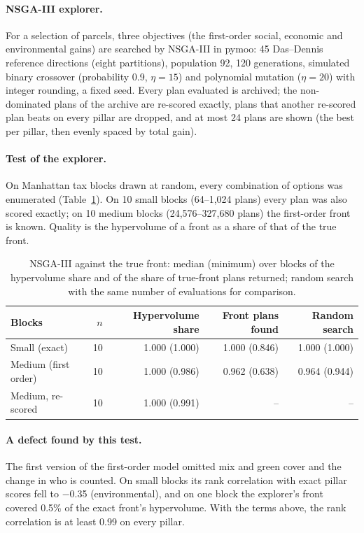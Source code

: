\documentclass[10pt]{article}
\begin{document}
\paragraph{NSGA-III explorer.} For a selection of parcels, three objectives (the first-order social, economic and
environmental gains) are searched by NSGA-III \citep{deb2014} in pymoo: 45 Das--Dennis reference
directions (eight partitions), population 92, 120 generations, simulated binary crossover
(probability 0.9, $\eta = 15$) and polynomial mutation ($\eta = 20$) with integer rounding, a fixed seed. Every plan
evaluated is archived; the non-dominated plans of the archive are re-scored exactly, plans that another re-scored
plan beats on every pillar are dropped, and at most 24 plans are shown (the best per pillar, then evenly
spaced by total gain).

\paragraph{Test of the explorer.} On Manhattan tax blocks drawn at random, every combination of options was enumerated
(Table~\ref{tab:s-nsga}). On 10 small blocks (64--1{,}024 plans) every plan was also scored exactly;
on 10 medium blocks (24{,}576--327{,}680 plans) the first-order front is known. Quality is the hypervolume of a
front as a share of that of the true front.

\begin{table}[t]
\centering
\footnotesize
\setlength{\tabcolsep}{4pt}
\caption{NSGA-III against the true front: median (minimum) over blocks of the hypervolume share and of the share of true-front plans returned; random search with the same number of evaluations for comparison.}
\label{tab:s-nsga}
\begin{tabular}{lrrrr}
\toprule
Blocks & $n$ & Hypervolume share & Front plans found & Random search \\
\midrule
Small (exact) & 10 & 1.000 (1.000) & 1.000 (0.846) & 1.000 (1.000) \\
Medium (first order) & 10 & 1.000 (0.986) & 0.962 (0.638) & 0.964 (0.944) \\
Medium, re-scored & 10 & 1.000 (0.991) & -- & -- \\
\bottomrule
\end{tabular}
\end{table}

\paragraph{A defect found by this test.} The first version of the first-order model omitted mix and green cover and
the change in who is counted. On small blocks its rank correlation with exact pillar scores fell to
$-$0.35 (environmental), and on one block the explorer's front covered 0.5\% of the exact
front's hypervolume. With the terms above, the rank correlation is at least 0.99 on every pillar.
\end{document}
